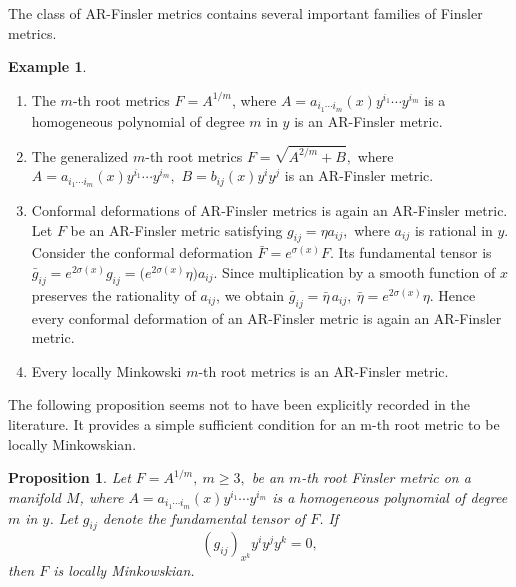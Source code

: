 \documentclass[12pt]{article}
\newtheorem{proposition}[theorem]{Proposition}
\theoremstyle{definition}
\newtheorem{example}[theorem]{Example}
\begin{document}
		The class of AR-Finsler metrics contains several important families of Finsler metrics.
		
		\begin{example}
			\begin{enumerate}
				
				\item[(i)]\cite{taha2023} \textnormal{The \(m\)-th root metrics
					$F=A^{1/m}$, 
					where $A=a_{i_1\cdots i_m}(x)y^{i_1}\cdots y^{i_m}$
					is a homogeneous polynomial of degree \(m\) in \(y\) is an AR-Finsler metric.}
					
					\item[(ii)]\cite{BG1}\textnormal{The generalized \(m\)-th root metrics $F=\sqrt{A^{2/m}+B},$ where $A=a_{i_1\cdots i_m}(x)y^{i_1}\cdots y^{i_m},$
						$B=b_{ij}(x)y^iy^j$ is an AR-Finsler metric.}
						
						\item[(iii)] \textnormal{Conformal deformations of AR-Finsler metrics is again an AR-Finsler metric. Let \(F\) be an AR-Finsler metric satisfying $g_{ij}=\eta a_{ij},$
							where \(a_{ij}\) is rational in \(y\). Consider the conformal deformation $\bar F=e^{\sigma(x)}F.$
							Its fundamental tensor is $\bar g_{ij}
							=
							e^{2\sigma(x)}g_{ij}
							=
							\bigl(e^{2\sigma(x)}\eta\bigr)a_{ij}.$
							Since multiplication by a smooth function of \(x\) preserves the rationality of \(a_{ij}\), we obtain $\bar g_{ij} =\bar\eta\, a_{ij},~
							\bar\eta=e^{2\sigma(x)}\eta.$
							Hence every conformal deformation of an AR-Finsler metric is again an AR-Finsler metric.}
							\item[(iv)] \textnormal{Every locally Minkowski \(m\)-th root metrics is an AR-Finsler metric.}
						\end{enumerate}
					\end{example}
					
					The following proposition seems not to have been explicitly recorded in the literature. It provides a simple sufficient condition for an m-th root metric to be locally Minkowskian.
					\begin{proposition}
						Let $F=A^{1/m}, ~ m\ge 3,$
						be an \(m\)-th root Finsler metric on a manifold \(M\), where $A=a_{i_1\cdots i_m}(x)y^{i_1}\cdots y^{i_m}$ is a homogeneous polynomial of degree \(m\) in \(y\). Let \(g_{ij}\) denote the fundamental tensor of \(F\). If
						\[
						(g_{ij})_{x^k}y^iy^jy^k=0,
						\]
						then \(F\) is locally Minkowskian.
					\end{proposition}
					
\end{document}
